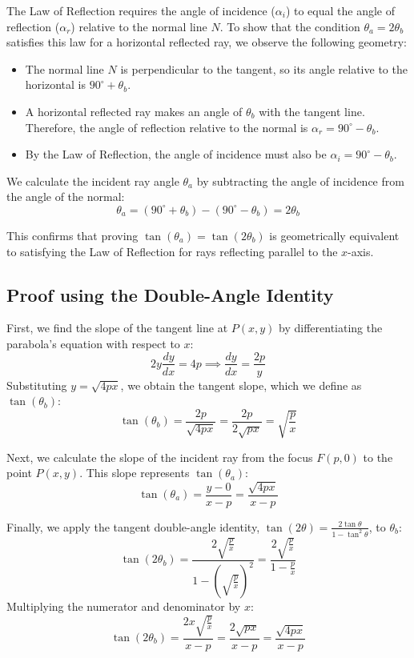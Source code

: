 \documentclass{article}
\begin{document}
The Law of Reflection requires the angle of incidence ($\alpha_i$) to equal the angle of reflection ($\alpha_r$) relative to the normal line $N$. To show that the condition $\theta_a = 2\theta_b$ satisfies this law for a horizontal reflected ray, we observe the following geometry:

\begin{itemize}
    \item The normal line $N$ is perpendicular to the tangent, so its angle relative to the horizontal is $90^\circ + \theta_b$.
    \item A horizontal reflected ray makes an angle of $\theta_b$ with the tangent line. Therefore, the angle of reflection relative to the normal is $\alpha_r = 90^\circ - \theta_b$.
    \item By the Law of Reflection, the angle of incidence must also be $\alpha_i = 90^\circ - \theta_b$.
\end{itemize}

We calculate the incident ray angle $\theta_a$ by subtracting the angle of incidence from the angle of the normal:
\[ \theta_a = (90^\circ + \theta_b) - (90^\circ - \theta_b) = 2\theta_b \]

This confirms that proving $\tan(\theta_a) = \tan(2\theta_b)$ is geometrically equivalent to satisfying the Law of Reflection for rays reflecting parallel to the $x$-axis.

\subsection{Proof using the Double-Angle Identity}
First, we find the slope of the tangent line at $P(x, y)$ by differentiating the parabola's equation with respect to $x$:
\[ 2y \frac{dy}{dx} = 4p \implies \frac{dy}{dx} = \frac{2p}{y} \]
Substituting $y = \sqrt{4px}$, we obtain the tangent slope, which we define as $\tan(\theta_b)$:
\[ \tan(\theta_b) = \frac{2p}{\sqrt{4px}} = \frac{2p}{2\sqrt{px}} = \sqrt{\frac{p}{x}} \]

Next, we calculate the slope of the incident ray from the focus $F(p, 0)$ to the point $P(x, y)$. This slope represents $\tan(\theta_a)$:
\[ \tan(\theta_a) = \frac{y - 0}{x - p} = \frac{\sqrt{4px}}{x - p} \]

Finally, we apply the tangent double-angle identity, $\tan(2\theta) = \frac{2\tan\theta}{1 - \tan^2\theta}$, to $\theta_b$:
\[ \tan(2\theta_b) = \frac{2\sqrt{\frac{p}{x}}}{1 - \left(\sqrt{\frac{p}{x}}\right)^2} = \frac{2\sqrt{\frac{p}{x}}}{1 - \frac{p}{x}} \]
Multiplying the numerator and denominator by $x$:
\[ \tan(2\theta_b) = \frac{2x\sqrt{\frac{p}{x}}}{x - p} = \frac{2\sqrt{px}}{x - p} = \frac{\sqrt{4px}}{x - p} \]
\end{document}
